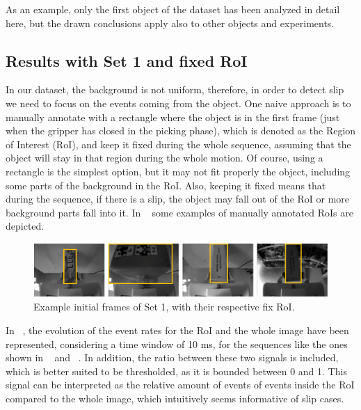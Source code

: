 As an example, only the first object of the dataset has been analyzed in detail here, but the drawn conclusions apply also to other objects and experiments.

\subsection{Results with Set 1 and fixed RoI}

In our dataset, the background is not uniform, therefore, in order to detect slip we need to focus on the events coming from the object. One naive approach is to manually annotate with a rectangle where the object is in the first frame (just when the gripper has closed in the picking phase), which is denoted as the Region of Interest (RoI), and keep it fixed during the whole sequence, assuming that the object will stay in that region during the whole motion. Of course, using a rectangle is the simplest option, but it may not fit properly the object, including some parts of the background in the RoI. Also, keeping it fixed means that during the sequence, if there is a slip, the object may fall out of the RoI or more background parts fall into it. In ~ some examples of manually annotated RoIs are depicted.

\begin{figure}[h]
    \centering
    \includegraphics[width=\textwidth]{resources/images/fix_roi}
    \caption{Example initial frames of Set 1, with their respective fix RoI.}\label{fig:fix_roi}
\end{figure}

In ~, the evolution of the event rates for the RoI and the whole image have been represented, considering a time window of 10 ms, for the sequences like the ones shown in ~ and ~. In addition, the ratio between these two signals is included, which is better suited to be thresholded, as it is bounded between 0 and 1. This signal can be interpreted as the relative amount of events of events inside the RoI compared to the whole image, which intuitively seems informative of slip cases. 

